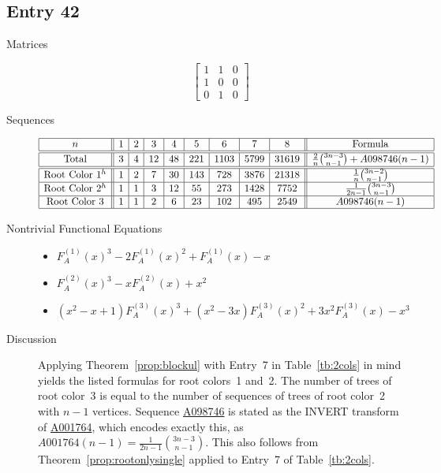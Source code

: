 \documentclass[12pt]{amsart}
\newcommand{\seqnum}[1]{\href{https://oeis.org/#1}{#1}}
\newcommand{\gff}[2]{F_{#2}^{(#1)}(x)}
\newcommand{\gfa}[1]{\gff{#1}{A}}
\begin{document}
\subsection*{Entry 42}
\begin{description}
    \item[Matrices]
    
    \[\begin{bmatrix}
1 & 1 & 0 \\
1 & 0 & 0 \\
0 & 1 & 0
\end{bmatrix}\]
    \item[Sequences]\hspace*{\fill}\vspace{-0.5cm}
    \begin{center}
        \[
        \begin{array}{|c||c|c|c|c|c|c|c|c||c|}\hline
           n  & 1 & 2 & 3 & 4 & 5 & 6 & 7 & 8  & \text{Formula}\\\hline\hline
           \text{Total}  & 3 & 4 & 12 & 48 & 221 & 1103 & 5799 & 31619 & \frac{2}{n}\binom{3n-3}{n-1}+A098746(n-1)\\\hline\hline
           \text{Root Color }1^{h} & 1 & 2 & 7 & 30 & 143 & 728 & 3876 & 21318 & \frac{1}{n}\binom{3n-2}{n-1}\\\hline
           \text{Root Color }2^{h} & 1 & 1 & 3 & 12 & 55 & 273 & 1428 & 7752 & \frac{1}{2n-1}\binom{3n-3}{n-1}\\\hline
           \text{Root Color }3 & 1 & 1 & 2 & 6 & 23 & 102 & 495 & 2549 & A098746(n-1)\\\hline
        \end{array}
        \]
    \end{center}
    
    \item[Nontrivial Functional Equations]\hspace*{\fill}

    \begin{itemize}
\item $\gfa{1}^3-2\gfa{1}^2+\gfa{1}-x$


\item $\gfa{2}^3-x\gfa{2}+x^2$


\item $(x^2 - x + 1)\gfa{3}^3+(x^2 - 3x)\gfa{3}^2+3x^2\gfa{3}-x^3$


\end{itemize}
    \item[Discussion] 
    Applying Theorem~\ref{prop:blockul} with Entry~7 in Table~\ref{tb:2cols} 
    in mind yields the listed formulas for root colors~1 and~2.
    The number of trees of root color~3 is equal to the number of sequences of trees of root color~2 with $n-1$ vertices. Sequence \seqnum{A098746} is stated as the INVERT transform of \seqnum{A001764}, which encodes exactly this, as $A001764(n-1)=\frac{1}{2n-1}\binom{3n-3}{n-1}$. This also follows from Theorem~\ref{prop:rootonlysingle} applied to Entry~7 of Table~\ref{tb:2cols}.


\end{description}
\end{document}
